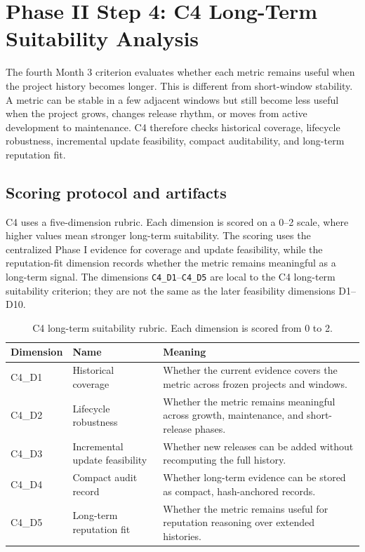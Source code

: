 \section{Phase II Step 4: C4 Long-Term Suitability Analysis}
\label{sec:phase2_c4_longterm_suitability}

The fourth Month 3 criterion evaluates whether each metric remains useful when the project history becomes longer.
This is different from short-window stability. A metric can be stable in a few adjacent windows but still become
less useful when the project grows, changes release rhythm, or moves from active development to maintenance.
C4 therefore checks historical coverage, lifecycle robustness, incremental update feasibility, compact auditability,
and long-term reputation fit.

\subsection{Scoring protocol and artifacts}
\label{sec:c4_protocol_artifacts}

C4 uses a five-dimension rubric. Each dimension is scored on a 0--2 scale, where higher values mean stronger
long-term suitability. The scoring uses the centralized Phase I evidence for coverage and update feasibility,
while the reputation-fit dimension records whether the metric remains meaningful as a long-term signal. The
dimensions \texttt{C4\_D1}--\texttt{C4\_D5} are local to the C4 long-term suitability criterion; they are not
the same as the later feasibility dimensions D1--D10.

\begin{table}[H]
\centering
\scriptsize
\renewcommand{\arraystretch}{1.08}
\begin{tabularx}{\textwidth}{p{2.1cm}p{3.8cm}X}
\toprule
\textbf{Dimension} & \textbf{Name} & \textbf{Meaning} \\
\midrule
C4\_D1 & Historical coverage & Whether the current evidence covers the metric across frozen projects and windows. \\
C4\_D2 & Lifecycle robustness & Whether the metric remains meaningful across growth, maintenance, and short-release phases. \\
C4\_D3 & Incremental update feasibility & Whether new releases can be added without recomputing the full history. \\
C4\_D4 & Compact audit record & Whether long-term evidence can be stored as compact, hash-anchored records. \\
C4\_D5 & Long-term reputation fit & Whether the metric remains useful for reputation reasoning over extended histories. \\
\bottomrule
\end{tabularx}
\caption{C4 long-term suitability rubric. Each dimension is scored from 0 to 2.}
\label{tab:c4_rubric}
\end{table}

